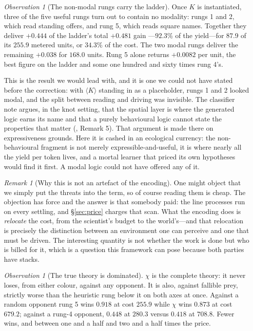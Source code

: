 \documentclass[11pt]{article}
\theoremstyle{definition}
\theoremstyle{plain}
\theoremstyle{remark}
\newtheorem{remark}[definition]{Remark}
\newtheorem{observation}[definition]{Observation}
\begin{document}
\begin{observation}[The non-modal rungs carry the ladder]\label{obs:spatial}
Once $K$ is instantiated, three of the five useful rungs turn out to contain no
modality: rungs 1 and 2, which read standing offers, and rung 5, which reads
square names. Together they deliver $+0.444$ of the ladder's total $+0.481$ gain
---$92.3\%$ of the yield---for $87.9$ of its $255.9$ metered units, or $34.3\%$
of the cost. The two modal rungs deliver the remaining $+0.038$ for $168.0$
units. Rung 5 alone returns $+0.0082$ per unit, the best figure on the ladder
and some one hundred and sixty times rung 4's.
\end{observation}

This is the result we would lead with, and it is one we could not have stated
before the correction: with $\langle K\rangle$ standing in as a placeholder,
rungs 1 and 2 looked modal, and the split between reading and driving was
invisible. The classifier note argues, in the knot setting, that the spatial
layer is where the generated logic earns its name and that a purely behavioural
logic cannot state the properties that matter (\cite{classifier}, Remark 5).
That argument is made there on expressiveness grounds. Here it is cashed in an
ecological currency: the non-behavioural fragment is not merely
expressible-and-useful, it is where nearly all the yield per token lives, and a
mortal learner that priced its own hypotheses would find it first. A modal logic
could not have offered any of it.

\begin{remark}[Why this is not an artefact of the encoding]
One might object that we simply put the threats into the term, so of course
reading them is cheap. The objection has force and the answer is that somebody
paid: the line processes run on every settling, and \S\ref{sec:price} charges
that scan. What the encoding does is \emph{relocate} the cost, from the
scientist's budget to the world's---and that relocation is precisely the
distinction between an environment one can perceive and one that must be driven.
The interesting quantity is not whether the work is done but who is billed for
it, which is a question this framework can pose because both parties have
stacks.
\end{remark}

\begin{observation}[The true theory is dominated]\label{obs:chi}
$\chi$ is the complete theory: it never loses, from either colour, against any
opponent. It is also, against fallible prey, strictly worse than the heuristic
rung below it on both axes at once. Against a random opponent rung 5 wins
$0.918$ at cost $255.9$ while $\chi$ wins $0.873$ at cost $679.2$; against a
rung-4 opponent, $0.448$ at $280.3$ versus $0.418$ at $708.8$. Fewer wins, and
between one and a half and two and a half times the price.
\end{observation}
\end{document}
